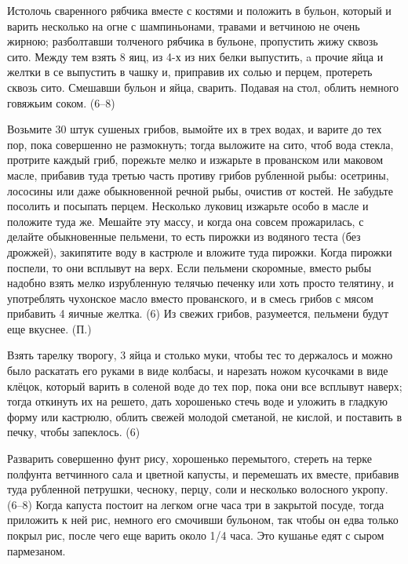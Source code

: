 Истолочь сваренного рябчика вместе с костями и положить в бульон, который и варить несколько на огне с шампиньонами, травами и ветчиною не очень жирною; разболтавши толченого рябчика в бульоне, пропустить жижу сквозь сито. Между тем взять 8 яиц, из 4-х из них белки выпустить, a прочие яйца и желтки в се выпустить в чашку и, приправив их солью и перцем, протереть сквозь сито. Смешавши бульон и яйца, сварить. Подавая на стол, облить немного говяжьим соком. (6--8) 


Возьмите 30 штук сушеных грибов, вымойте их в трех водах, и варите до тех пор, пока совершенно не размокнуть; тогда выложите на сито, чтоб вода стекла, протрите каждый гриб, порежьте мелко и изжарьте в прованском или маковом масле, прибавив туда третью часть противу грибов рубленной рыбы: осетрины, лососины или даже обыкновенной речной рыбы, очистив от костей. Не забудьте посолить и посыпать перцем. Несколько луковиц изжарьте особо в масле и положите туда же. Мешайте эту массу, и когда она совсем прожарилась, с делайте обыкновенные пельмени, то есть пирожки из водяного теста (без дрожжей), закипятите воду в кастрюле и вложите туда пирожки. Когда пирожки поспели, то они всплывут на верх. Если пельмени скоромные, вместо рыбы надобно взять мелко изрубленную телячью печенку или хоть просто телятину, и употреблять чухонское масло вместо прованского, и в смесь грибов с мясом прибавить 4 яичные желтка. (6) Из свежих грибов, разумеется, пельмени будут еще вкуснее. (П.) 


Взять тарелку творогу, 3 яйца и столько муки, чтобы тес то держалось и можно было раскатать его руками в виде колбасы, и нарезать ножом кусочками в виде клёцок, который варить в соленой воде до тех пор, пока они все всплывут наверх; тогда откинуть их на решето, дать хорошенько стечь воде и уложить в гладкую форму или кастрюлю, облить свежей молодой сметаной, не кислой, и поставить в печку, чтобы запеклось. (6)


Разварить совершенно фунт рису, хорошенько перемытого, стереть на терке полфунта ветчинного сала и цветной капусты, и перемешать их вместе, прибавив туда рубленной петрушки, чесноку, перцу, соли и несколько волосного укропу. (6--8) Когда капуста постоит на легком огне часа три в закрытой посуде, тогда приложить к ней рис, немного его смочивши бульоном, так чтобы он едва только покрыл рис, после чего еще варить около 1/4 часа. Это кушанье едят с сыром пармезаном.

